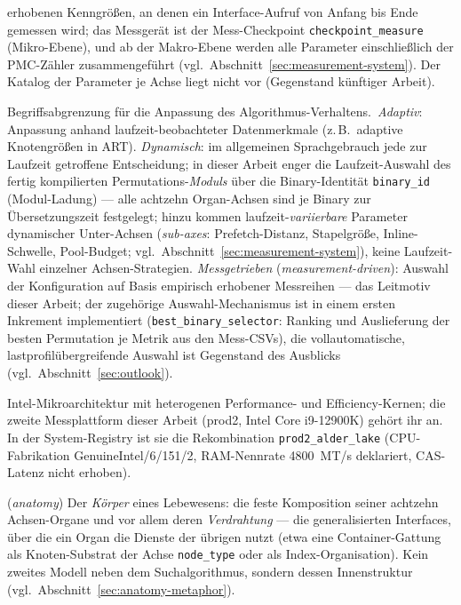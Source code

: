 \begin{description}
  erhobenen Kenngrößen, an denen ein Interface-Aufruf von Anfang bis Ende gemessen wird; das
  Messgerät ist der Mess-Checkpoint \texttt{checkpoint\_measure} (Mikro-Ebene), und ab der
  Makro-Ebene werden alle Parameter einschließlich der PMC-Zähler zusammengeführt
  (vgl.\ Abschnitt~\ref{sec:measurement-system}). Der Katalog der Parameter je Achse liegt nicht vor
  (Gegenstand künftiger Arbeit).
  \item[Adaptiv vs.\ dynamisch vs.\ messgetrieben] Begriffsabgrenzung für die Anpassung des
  Algorithmus-Verhaltens.\ \emph{Adaptiv}: Anpassung anhand laufzeit-beobachteter Datenmerkmale
  (z.\,B.\ adaptive Knotengrößen in ART)\@. \emph{Dynamisch}: im allgemeinen Sprachgebrauch jede zur
  Laufzeit getroffene Entscheidung; in dieser Arbeit enger die Laufzeit-Auswahl des fertig
  kompilierten Permutations-\emph{Moduls} über die Binary-Identität \texttt{binary\_id}
  (Modul-Ladung) --- alle achtzehn Organ-Achsen sind je Binary zur Übersetzungszeit festgelegt; hinzu kommen
  laufzeit-\emph{variierbare} Parameter dynamischer Unter-Achsen (\emph{sub-axes}: Prefetch-Distanz,
  Stapelgröße, Inline-Schwelle, Pool-Budget; vgl.\ Abschnitt~\ref{sec:measurement-system}), keine
  Laufzeit-Wahl einzelner Achsen-Strategien.
  \emph{Messgetrieben} (\emph{measurement-driven}): Auswahl der Konfiguration auf Basis empirisch
  erhobener Messreihen --- das Leitmotiv dieser Arbeit; der
  zugehörige Auswahl-Mechanismus ist in einem ersten Inkrement implementiert
  (\texttt{best\_binary\_selector}: Ranking und Auslieferung der besten Permutation je Metrik aus
  den Mess-CSVs), die vollautomatische, lastprofilübergreifende Auswahl ist Gegenstand des Ausblicks
  (vgl.\ Abschnitt~\ref{sec:outlook}).
  \item[Alder Lake] Intel-Mikroarchitektur mit heterogenen Performance- und Efficiency-Kernen; die
  zweite Messplattform dieser Arbeit (prod2, Intel Core i9-12900K) gehört ihr an. In der
  System-Registry ist sie die Rekombination \texttt{prod2\_alder\_lake} (CPU-Fabrikation
  GenuineIntel/6/151/2, RAM-Nennrate 4800~MT/s deklariert, CAS-Latenz nicht erhoben).
  \item[Anatomie] (\emph{anatomy}) Der \emph{Körper} eines Lebewesens: die feste Komposition seiner
  achtzehn Achsen-Organe und vor allem deren \emph{Verdrahtung} --- die generalisierten Interfaces,
  über die ein Organ die Dienste der übrigen nutzt (etwa eine Container-Gattung als Knoten-Substrat der
  Achse \texttt{node\_type} oder als Index-Organisation). Kein zweites Modell neben dem
  Suchalgorithmus, sondern dessen Innenstruktur (vgl.\ Abschnitt~\ref{sec:anatomy-metaphor}).

\end{description}
